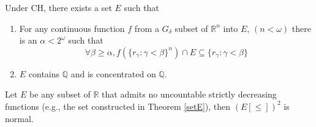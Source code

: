 \documentclass[10pt,a4paper]{amsart}
\newcommand{\Q}{\mathbb{Q}}
\begin{document}
\begin{theorem}\label{setE}
    Under CH, there exists a set $E$ such that 
    \begin{enumerate}
        \item For any continuous function $f$ from a $G_\delta$ subset of ${\mathbb R}^n$ into $E$, $(n<\omega)$ there is an $\alpha<2^\omega$ such that
        \[
        \forall \beta\geq \alpha, f(\{r_\gamma:\gamma<\beta\}^n) \cap E \subseteq \{r_\gamma:\gamma<\beta\}
        \]
        \item $E$ contains $\Q$ and is concentrated on ${\mathbb Q}$. 
    \end{enumerate}
\end{theorem}

\begin{theorem}
    Let $E$ be any subset of ${\mathbb R}$ that admits no uncountable strictly decreasing functions (e.g., the set constructed in Theorem \ref{setE}), then $(E[\leq])^2$ is normal.
\end{theorem}
\end{document}
